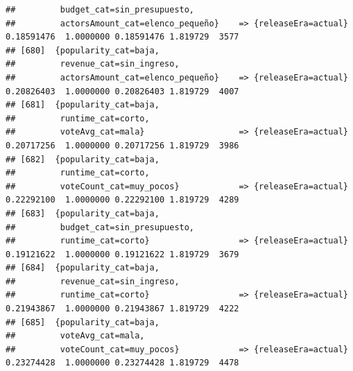 \documentclass[
]{article}
\begin{document}
\begin{verbatim}
##         budget_cat=sin_presupuesto,                                                                                             
##         actorsAmount_cat=elenco_pequeño}    => {releaseEra=actual}               0.18591476  1.0000000 0.18591476 1.819729  3577
## [680]  {popularity_cat=baja,                                                                                                    
##         revenue_cat=sin_ingreso,                                                                                                
##         actorsAmount_cat=elenco_pequeño}    => {releaseEra=actual}               0.20826403  1.0000000 0.20826403 1.819729  4007
## [681]  {popularity_cat=baja,                                                                                                    
##         runtime_cat=corto,                                                                                                      
##         voteAvg_cat=mala}                   => {releaseEra=actual}               0.20717256  1.0000000 0.20717256 1.819729  3986
## [682]  {popularity_cat=baja,                                                                                                    
##         runtime_cat=corto,                                                                                                      
##         voteCount_cat=muy_pocos}            => {releaseEra=actual}               0.22292100  1.0000000 0.22292100 1.819729  4289
## [683]  {popularity_cat=baja,                                                                                                    
##         budget_cat=sin_presupuesto,                                                                                             
##         runtime_cat=corto}                  => {releaseEra=actual}               0.19121622  1.0000000 0.19121622 1.819729  3679
## [684]  {popularity_cat=baja,                                                                                                    
##         revenue_cat=sin_ingreso,                                                                                                
##         runtime_cat=corto}                  => {releaseEra=actual}               0.21943867  1.0000000 0.21943867 1.819729  4222
## [685]  {popularity_cat=baja,                                                                                                    
##         voteAvg_cat=mala,                                                                                                       
##         voteCount_cat=muy_pocos}            => {releaseEra=actual}               0.23274428  1.0000000 0.23274428 1.819729  4478

\end{verbatim}
\end{document}
